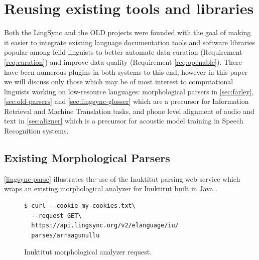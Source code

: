\documentclass[11pt]{article}
\newcommand{\smalltodo}[2][]
    {\todo[caption={#2}, #1]
    {\tiny#2\normalsize}}
\begin{document}
\section{Reusing existing tools and libraries}
\label{sec:plugins}


Both the LingSync and the OLD projects were founded with the goal of making it easier to integrate existing language documentation tools and software libraries popular among feild linguists to better automate data curation (Requirement \autoref{req:curation}) and improve data quality (Requirement \autoref{req:openable}). There have been numerous plugins in both systems to this end, however in this paper we will discuss only those which may be of most interest to computational linguists working on low-resource languages: morphological parsers in \autoref{sec:farley},  \autoref{sec:old-parsers} and  \autoref{sec:lingsync-glosser} which are a precursor for Information Retrieval and Machine Translation tasks, and  phone level alignment of audio and text in  \autoref{sec:aligner} which is a precursor for acoustic model training in Speech Recognition systems.


\subsection{Existing Morphological Parsers}
\label{sec:farley}

\autoref{lingsync-parse} illustrates the use of the Inuktitut parsing web service which wraps an existing
morphological analyzer for Inuktitut built in Java \cite{Farley:2012:Online}.


\begin{figure}[h]
\scriptsize
\begin{verbatim}
$ curl --cookie my-cookies.txt\
  --request GET\
  https://api.lingsync.org/v2/elanguage/iu/
  parses/arraagunullu
\end{verbatim}
\normalsize
\caption{Inuktitut morphological analyzer request.}
\label{lingsync-parse}
\end{figure}
\end{document}
